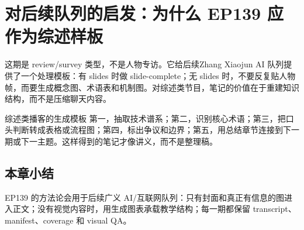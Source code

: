 \section{对后续队列的启发：为什么 EP139 应作为综述样板}

这期是 review/survey 类型，不是人物专访。它给后续Zhang Xiaojun AI 队列提供了一个处理模板：有 slides 时做 slide-complete；无 slides 时，不要反复贴人物帧，而要生成概念图、术语表和机制图。对综述类节目，笔记的价值在于重建知识结构，而不是压缩聊天内容。

\begin{knowledgebox}{综述类播客的生成模板}
第一，抽取技术谱系；第二，识别核心术语；第三，把口头判断转成表格或流程图；第四，标出争议和边界；第五，用总结章节连接到下一期或下一主题。这样得到的笔记才像讲义，而不是整理稿。
\end{knowledgebox}

\subsection{本章小结}

EP139 的方法论会用于后续广义 AI/互联网队列：只有封面和真正有信息的图进入正文；没有视觉内容时，用生成图表承载教学结构；每一期都保留 transcript、manifest、coverage 和 visual QA。


